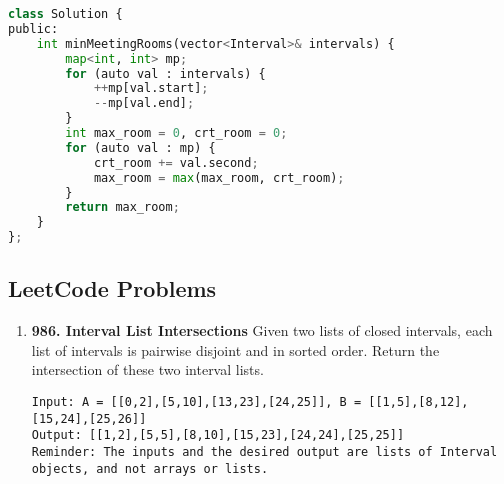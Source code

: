 \documentclass[../main.tex]{subfiles}
\begin{document}

\begin{lstlisting}[language=Python]
class Solution {
public:
    int minMeetingRooms(vector<Interval>& intervals) {
        map<int, int> mp;
        for (auto val : intervals) {
            ++mp[val.start];
            --mp[val.end];
        }
        int max_room = 0, crt_room = 0;
        for (auto val : mp) {
            crt_room += val.second;
            max_room = max(max_room, crt_room);
        }
        return max_room;
    }
};
\end{lstlisting}

\subsection{LeetCode Problems}
\begin{enumerate}
 \item \textbf{986. Interval List Intersections} Given two lists of closed intervals, each list of intervals is pairwise disjoint and in sorted order. Return the intersection of these two interval lists.
\begin{lstlisting}[numbers=none]
Input: A = [[0,2],[5,10],[13,23],[24,25]], B = [[1,5],[8,12],[15,24],[25,26]]
Output: [[1,2],[5,5],[8,10],[15,23],[24,24],[25,25]]
Reminder: The inputs and the desired output are lists of Interval objects, and not arrays or lists.
\end{lstlisting}
\end{enumerate}
\end{document}
